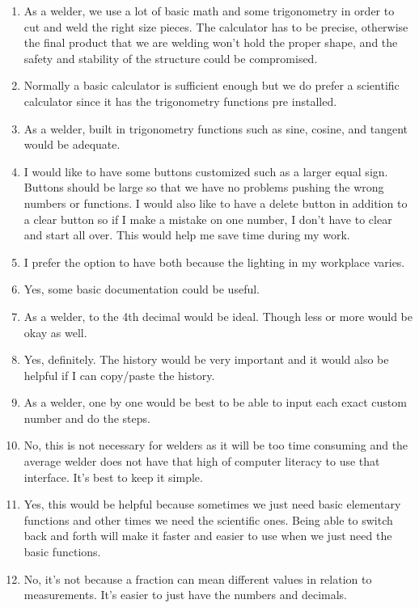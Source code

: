 \documentclass[titlepage]{article}
\begin{document}
\begin{itemize}
\begin{enumerate}
                        \item As a welder, we use a lot of basic math and some trigonometry in order to cut and weld the right size pieces. The calculator has to be precise, otherwise the final product that we are welding won’t hold the proper shape, and the safety and stability of the structure could be compromised.
                        \item Normally a basic calculator is sufficient enough but we do prefer a scientific calculator since it has the trigonometry functions pre installed.
                        \item As a welder, built in trigonometry functions such as sine, cosine, and tangent would be adequate.
                        \item I would like to have some buttons customized such as a larger equal sign. Buttons should be large so that we have no problems pushing the wrong numbers or functions. I would also like to have a delete button in addition to a clear button so if I make a mistake on one number, I don’t have to clear and start all over. This would help me save time during my work.
                        \item I prefer the option to have both because the lighting in my workplace varies.
                        \item Yes, some basic documentation could be useful.
                        \item As a welder, to the 4th decimal would be ideal. Though less or more would be okay as well.
                        \item Yes, definitely. The history would be very important and it would also be helpful if I can copy/paste the history.
                        \item As a welder, one by one would be best to be able to input each exact custom number and do the steps.
                        \item No, this is not necessary for welders as it will be too time consuming and the average welder does not have that high of computer literacy to use that interface. It’s best to keep it simple.
                       \item Yes, this would be helpful because sometimes we just need basic elementary functions and other times we need the scientific ones. Being able to switch back and forth will make it faster and easier to use when we just need the basic functions.
                        \item No, it’s not because a fraction can mean different values in relation to measurements. It’s easier to just have the numbers and decimals.

\end{enumerate}
\end{itemize}
\end{document}
